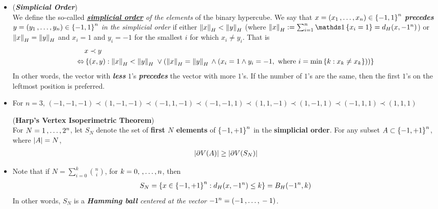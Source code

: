 \documentclass[11pt]{article}
\begin{document}
\begin{itemize}
\item \begin{definition} (\textbf{\emph{Simplicial Order}})\\
We define the so-called \emph{\underline{\textbf{simplicial order}} of the elements} of the binary hypercube. We say that $x = (x_1 \,{,}\ldots{,}\, x_n) \in \left\{-1, 1\right\}^n$ \emph{\textbf{precedes}} $y = (y_1 \,{,}\ldots{,}\, y_n) \in \left\{-1, 1\right\}^n$  \emph{in the simplicial order} if either $\left\|x\right\|_{H} < \left\|y\right\|_{H}$ (where $\norm{x}{H} := \sum_{i=1}^{n}\ind{x_i = 1} = d_{H}(x, -1^n)$) or $\left\|x\right\|_{H} = \left\|y\right\|_{H}$ and $x_i = 1$ and $y_i = -1$ for the smallest $i$ for which $x_i \neq y_i$.  That is
\begin{align*}
&x \prec y \\
\Leftrightarrow &\left\{(x,y): \left\|x\right\|_{H} < \left\|y\right\|_{H} \; \lor (\left\|x\right\|_{H} = \left\|y\right\|_{H} \, \land (x_i =1 \land y_i = -1, \text{ where }i=\min\left\{k: x_k \neq x_k\right\} )) \right\}
\end{align*} In other words, the vector with \emph{\textbf{less}} $1$'s \emph{\textbf{precedes}} the vector with more $1$'s. If the number of $1$'s are the same, then the first $1$'s on the leftmost position is preferred.
\end{definition} 

\item \begin{example}
For $n=3$, $(-1, -1, -1) \prec (1, -1, -1) \prec (-1, 1, -1) \prec (-1, -1, 1) \prec (1, 1, -1) \prec (1, -1, 1) \prec (-1, 1, 1) \prec (1, 1, 1)$
\end{example}


\begin{theorem} (\textbf{Harp's Vertex Isoperimetric Theorem}) \citep{boucheron2013concentration}\\
For $N = 1 \,{,}\ldots{,}\, 2^n$, let $S_N$ denote the set of \textbf{first $N$ elements} of $\left\{-1, +1\right\}^n$ in the \textbf{simplicial order}. For any subset $A \subset \left\{-1, +1\right\}^n$, where $\left\lvert A \right\rvert = N$, 
\begin{align*}
\left\lvert \partial V(A) \right\rvert \ge \left\lvert \partial V(S_N) \right\rvert 
\end{align*}
\end{theorem}

\item \begin{remark}
Note that if $N = \sum_{i=0}^{k}{n \choose i}$, for $k=0, \,{,}\ldots{,}\, n$, then 
\begin{align*}
S_N = \left\{x \in \left\{-1, +1\right\}^n:  d_{H}(x, -1^n) \le k\right\} = B_{H}(-1^n, k)
\end{align*} In other words, $S_N$ is a \emph{\textbf{Hamming ball} centered at the vector $-1^n= (-1 \,{,}\ldots{,}\, -1)$}.
\end{remark}


\end{itemize}
\end{document}
